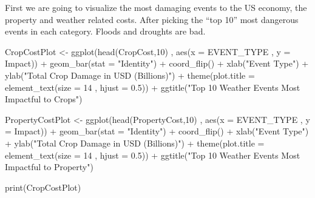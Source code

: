 \documentclass[
]{article}
\newenvironment{Shaded}{\begin{snugshade}}{\end{snugshade}}
\newcommand{\AttributeTok}[1]{\textcolor[rgb]{0.77,0.63,0.00}{#1}}
\newcommand{\DecValTok}[1]{\textcolor[rgb]{0.00,0.00,0.81}{#1}}
\newcommand{\FloatTok}[1]{\textcolor[rgb]{0.00,0.00,0.81}{#1}}
\newcommand{\FunctionTok}[1]{\textcolor[rgb]{0.00,0.00,0.00}{#1}}
\newcommand{\NormalTok}[1]{#1}
\newcommand{\OtherTok}[1]{\textcolor[rgb]{0.56,0.35,0.01}{#1}}
\newcommand{\SpecialCharTok}[1]{\textcolor[rgb]{0.00,0.00,0.00}{#1}}
\newcommand{\StringTok}[1]{\textcolor[rgb]{0.31,0.60,0.02}{#1}}
\begin{document}
First we are going to visualize the most damaging events to the US
economy, the property and weather related costs. After picking the ``top
10'' most dangerous events in each category. Floods and droughts are
bad.

\begin{Shaded}
\begin{Highlighting}[]
\NormalTok{CropCostPlot }\OtherTok{\textless{}{-}} \FunctionTok{ggplot}\NormalTok{(}\FunctionTok{head}\NormalTok{(CropCost,}\DecValTok{10}\NormalTok{)}
\NormalTok{                      , }\FunctionTok{aes}\NormalTok{(}\AttributeTok{x =}\NormalTok{ EVENT\_TYPE}
\NormalTok{                          , }\AttributeTok{y =}\NormalTok{ Impact)) }\SpecialCharTok{+}
                \FunctionTok{geom\_bar}\NormalTok{(}\AttributeTok{stat =} \StringTok{"Identity"}\NormalTok{) }\SpecialCharTok{+} 
                \FunctionTok{coord\_flip}\NormalTok{() }\SpecialCharTok{+}
                \FunctionTok{xlab}\NormalTok{(}\StringTok{"Event Type"}\NormalTok{) }\SpecialCharTok{+} 
                \FunctionTok{ylab}\NormalTok{(}\StringTok{"Total Crop Damage in USD (Billions)"}\NormalTok{) }\SpecialCharTok{+} 
                \FunctionTok{theme}\NormalTok{(}\AttributeTok{plot.title =} \FunctionTok{element\_text}\NormalTok{(}\AttributeTok{size =} \DecValTok{14}
\NormalTok{                                                , }\AttributeTok{hjust =} \FloatTok{0.5}\NormalTok{)) }\SpecialCharTok{+} 
                \FunctionTok{ggtitle}\NormalTok{(}\StringTok{"Top 10 Weather Events Most Impactful to Crops"}\NormalTok{)}

\NormalTok{PropertyCostPlot }\OtherTok{\textless{}{-}} \FunctionTok{ggplot}\NormalTok{(}\FunctionTok{head}\NormalTok{(PropertyCost,}\DecValTok{10}\NormalTok{)}
\NormalTok{                      , }\FunctionTok{aes}\NormalTok{(}\AttributeTok{x =}\NormalTok{ EVENT\_TYPE}
\NormalTok{                          , }\AttributeTok{y =}\NormalTok{ Impact)) }\SpecialCharTok{+}
                \FunctionTok{geom\_bar}\NormalTok{(}\AttributeTok{stat =} \StringTok{"Identity"}\NormalTok{) }\SpecialCharTok{+} 
                \FunctionTok{coord\_flip}\NormalTok{() }\SpecialCharTok{+}
                \FunctionTok{xlab}\NormalTok{(}\StringTok{"Event Type"}\NormalTok{) }\SpecialCharTok{+} 
                \FunctionTok{ylab}\NormalTok{(}\StringTok{"Total Crop Damage in USD (Billions)"}\NormalTok{) }\SpecialCharTok{+} 
                \FunctionTok{theme}\NormalTok{(}\AttributeTok{plot.title =} \FunctionTok{element\_text}\NormalTok{(}\AttributeTok{size =} \DecValTok{14}
\NormalTok{                                                , }\AttributeTok{hjust =} \FloatTok{0.5}\NormalTok{)) }\SpecialCharTok{+} 
                \FunctionTok{ggtitle}\NormalTok{(}\StringTok{"Top 10 Weather Events Most Impactful to Property"}\NormalTok{)}

\FunctionTok{print}\NormalTok{(CropCostPlot)}
\end{Highlighting}
\end{Shaded}
\end{document}
